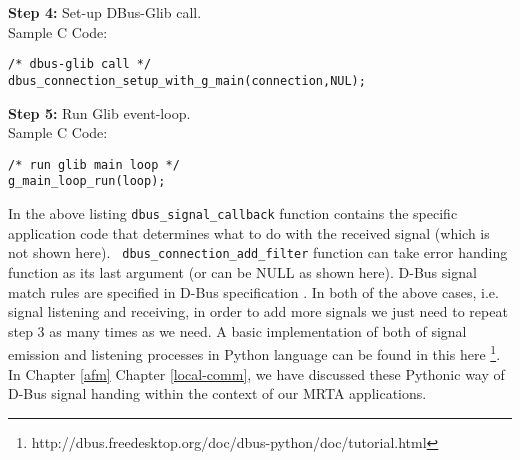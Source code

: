\textbf{Step 4:} Set-up DBus-Glib call.\\
Sample C Code:
\begin{lstlisting} 
/* dbus-glib call */
dbus_connection_setup_with_g_main(connection,NUL);
\end{lstlisting} 
\textbf{Step 5:} Run Glib event-loop.\\
Sample C Code:
\begin{lstlisting} 
/* run glib main loop */
g_main_loop_run(loop);
\end{lstlisting} 
In the above listing \texttt{dbus\_signal\_callback} function contains the specific application code that determines what to do with the received signal (which is not shown here). \texttt{ dbus\_connection\_add\_filter} function can take error handing function as its last argument (or can be NULL as shown here). D-Bus signal match rules are specified in D-Bus specification \cite{Pennington+2010}. In both of the above cases, i.e. signal listening and receiving, in order to add more signals we just need to repeat step 3  as many times as we need. A basic implementation of both of signal emission and listening processes in Python language can be found in this here \footnote{http://dbus.freedesktop.org/doc/dbus-python/doc/tutorial.html}. In Chapter \ref{afm} Chapter \ref{local-comm}, we have discussed these Pythonic way of D-Bus signal handing within the context of our MRTA applications.
